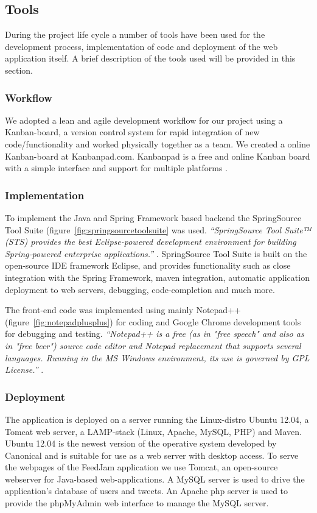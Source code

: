 \subsection{Tools} %
During the project life cycle a number of tools have been used for the development process, implementation of code and deployment of the web application itself. A brief description of the tools used will be provided in this section.


\subsubsection{Workflow}
We adopted a lean and agile development workflow for our project using a Kanban-board, a version control system for rapid integration of new code/functionality and worked physically together as a team. We created a online Kanban-board at Kanbanpad.com. Kanbanpad is a free and online Kanban board with a simple interface and support for multiple platforms \cite{TheHybridGroup2012}.

\subsubsection{Implementation}
To implement the Java and Spring Framework based backend the SpringSource Tool Suite (figure~\ref{fig:springsourcetoolsuite} was used. \textit{``SpringSource Tool Suite™ (STS) provides the best Eclipse-powered development environment for building Spring-powered enterprise applications.''} \cite{SpringSource}. SpringSource Tool Suite is built on the open-source IDE framework Eclipse, and provides functionality such as close integration with the Spring Framework, maven integration, automatic application deployment to web servers, debugging, code-completion and much more.

The front-end code was implemented using mainly Notepad++ (figure~\ref{fig:notepadplusplus}) for coding and Google Chrome development tools for debugging and testing. \textit{``Notepad++ is a free (as in "free speech" and also as in "free beer") source code editor and Notepad replacement that supports several languages. Running in the MS Windows environment, its use is governed by GPL License.''} \cite{Ho2012}.

\subsubsection{Deployment}
The application is deployed on a server running the Linux-distro Ubuntu 12.04, a Tomcat web server, a LAMP-stack (Linux, Apache, MySQL, PHP) and Maven. Ubuntu 12.04 is the newest version of the operative system developed by Canonical and is suitable for use as a web server with desktop access. To serve the webpages of the FeedJam application we use Tomcat, an open-source webserver for Java-based web-applications. A MySQL server is used to drive the application's database of users and tweets. An Apache php server is used to provide the phpMyAdmin web interface to manage the MySQL server.

